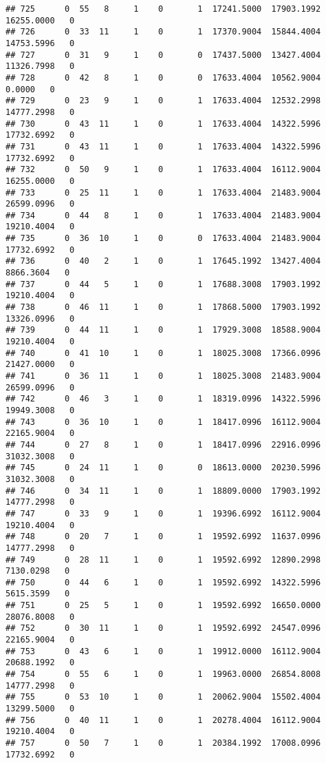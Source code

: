 \documentclass[
]{article}
\begin{document}
\begin{enumerate}
\begin{verbatim}
## 725      0  55   8     1    0       1  17241.5000  17903.1992  16255.0000   0
## 726      0  33  11     1    0       1  17370.9004  15844.4004  14753.5996   0
## 727      0  31   9     1    0       0  17437.5000  13427.4004  11326.7998   0
## 728      0  42   8     1    0       0  17633.4004  10562.9004      0.0000   0
## 729      0  23   9     1    0       1  17633.4004  12532.2998  14777.2998   0
## 730      0  43  11     1    0       1  17633.4004  14322.5996  17732.6992   0
## 731      0  43  11     1    0       1  17633.4004  14322.5996  17732.6992   0
## 732      0  50   9     1    0       1  17633.4004  16112.9004  16255.0000   0
## 733      0  25  11     1    0       1  17633.4004  21483.9004  26599.0996   0
## 734      0  44   8     1    0       1  17633.4004  21483.9004  19210.4004   0
## 735      0  36  10     1    0       0  17633.4004  21483.9004  17732.6992   0
## 736      0  40   2     1    0       1  17645.1992  13427.4004   8866.3604   0
## 737      0  44   5     1    0       1  17688.3008  17903.1992  19210.4004   0
## 738      0  46  11     1    0       1  17868.5000  17903.1992  13326.0996   0
## 739      0  44  11     1    0       1  17929.3008  18588.9004  19210.4004   0
## 740      0  41  10     1    0       1  18025.3008  17366.0996  21427.0000   0
## 741      0  36  11     1    0       1  18025.3008  21483.9004  26599.0996   0
## 742      0  46   3     1    0       1  18319.0996  14322.5996  19949.3008   0
## 743      0  36  10     1    0       1  18417.0996  16112.9004  22165.9004   0
## 744      0  27   8     1    0       1  18417.0996  22916.0996  31032.3008   0
## 745      0  24  11     1    0       0  18613.0000  20230.5996  31032.3008   0
## 746      0  34  11     1    0       1  18809.0000  17903.1992  14777.2998   0
## 747      0  33   9     1    0       1  19396.6992  16112.9004  19210.4004   0
## 748      0  20   7     1    0       1  19592.6992  11637.0996  14777.2998   0
## 749      0  28  11     1    0       1  19592.6992  12890.2998   7130.0298   0
## 750      0  44   6     1    0       1  19592.6992  14322.5996   5615.3599   0
## 751      0  25   5     1    0       1  19592.6992  16650.0000  28076.8008   0
## 752      0  30  11     1    0       1  19592.6992  24547.0996  22165.9004   0
## 753      0  43   6     1    0       1  19912.0000  16112.9004  20688.1992   0
## 754      0  55   6     1    0       1  19963.0000  26854.8008  14777.2998   0
## 755      0  53  10     1    0       1  20062.9004  15502.4004  13299.5000   0
## 756      0  40  11     1    0       1  20278.4004  16112.9004  19210.4004   0
## 757      0  50   7     1    0       1  20384.1992  17008.0996  17732.6992   0

\end{verbatim}
\end{enumerate}
\end{document}
